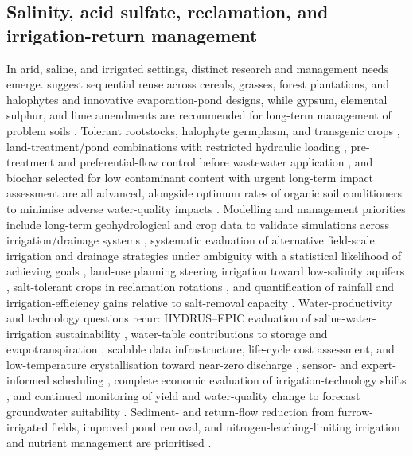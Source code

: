 \documentclass[11pt]{article}
\begin{document}
\subsection{Salinity, acid sulfate, reclamation, and irrigation-return management}

In arid, saline, and irrigated settings, distinct research and management needs emerge. \textcite{Sharma2004} suggest sequential reuse across cereals, grasses, forest plantations, and halophytes and innovative evaporation-pond designs, while gypsum, elemental sulphur, and lime amendments are recommended for long-term management of problem soils \parencite{MANN1982,He2015}. Tolerant rootstocks, halophyte germplasm, and transgenic crops \parencite{Cuevas2019}, land-treatment/pond combinations with restricted hydraulic loading \parencite{Christen2010}, pre-treatment and preferential-flow control before wastewater application \parencite{Duan2015}, and biochar selected for low contaminant content with urgent long-term impact assessment \parencite{Tian2023b} are all advanced, alongside optimum rates of organic soil conditioners to minimise adverse water-quality impacts \parencite{Zhang2015}. Modelling and management priorities include long-term geohydrological and crop data to validate simulations across irrigation/drainage systems \parencite{Yao2017}, systematic evaluation of alternative field-scale irrigation and drainage strategies under ambiguity with a statistical likelihood of achieving goals \parencite{Alzraiee2013}, land-use planning steering irrigation toward low-salinity aquifers \parencite{Bethune2008}, salt-tolerant crops in reclamation rotations \parencite{Qadir2001}, and quantification of rainfall and irrigation-efficiency gains relative to salt-removal capacity \parencite{Castanheira2010}. Water-productivity and technology questions recur: HYDRUS--EPIC evaluation of saline-water-irrigation sustainability \parencite{Feng2019}, water-table contributions to storage and evapotranspiration \parencite{Jia2017}, scalable data infrastructure, life-cycle cost assessment, and low-temperature crystallisation toward near-zero discharge \parencite{Qin2025}, sensor- and expert-informed scheduling \parencite{Abdelkrim2021}, complete economic evaluation of irrigation-technology shifts \parencite{DINAR1989}, and continued monitoring of yield and water-quality change to forecast groundwater suitability \parencite{RADSTAKE1988,Karegoudar2022,Qian2025,ElHassanin2022,Ayars2006}. Sediment- and return-flow reduction from furrow-irrigated fields, improved pond removal, and nitrogen-leaching-limiting irrigation and nutrient management are prioritised \parencite{Bjorneberg2020}.
\end{document}
